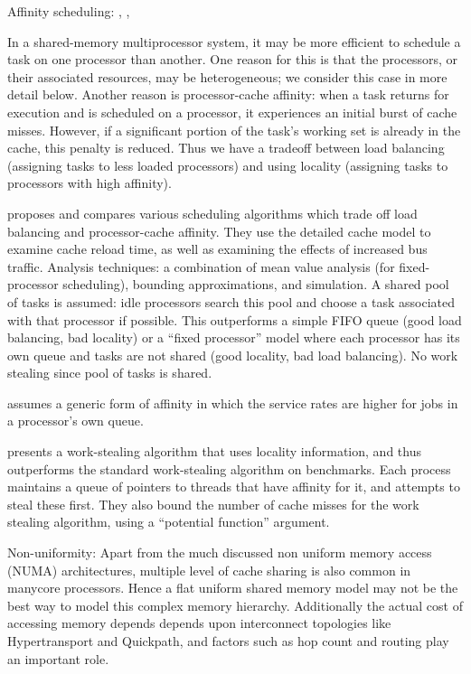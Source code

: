 
Affinity scheduling: \cite{Squillante1993}, \cite{Squillante2001},
\cite{Acar2002}

In a shared-memory multiprocessor system, it may be more efficient to
schedule a task on one processor than another. One reason for this is
that the processors, or their associated resources, may be
heterogeneous; we consider this case in more detail below. Another
reason is processor-cache affinity: when a task returns for execution
and is scheduled on a processor, it experiences an initial burst of
cache misses. However, if a significant portion of the task's working
set is already in the cache, this penalty is reduced. Thus we have a
tradeoff between load balancing (assigning tasks to less loaded
processors) and using locality (assigning tasks to processors with
high affinity).

\cite{Squillante1993} proposes and compares various scheduling
algorithms which trade off load balancing and processor-cache
affinity. They use the detailed cache model to examine cache reload
time, as well as examining the effects of increased bus
traffic. Analysis techniques: a combination of mean value analysis
(for fixed-processor scheduling), bounding approximations, and
simulation. A shared pool of tasks is assumed: idle processors search
this pool and choose a task associated with that processor if
possible. This outperforms a simple FIFO queue (good load balancing,
bad locality) or a ``fixed processor'' model where each processor has
its own queue and tasks are not shared (good locality, bad load
balancing). No work stealing since pool of tasks is shared.

\cite{Squillante2001} assumes a generic form of affinity in which the
service rates are higher for jobs in a processor's own queue.

\cite{Acar2002} presents a work-stealing algorithm that uses locality
information, and thus outperforms the standard work-stealing algorithm
on benchmarks. Each process maintains a queue of pointers to threads
that have affinity for it, and attempts to steal these first. They
also bound the number of cache misses for the work stealing algorithm,
using a ``potential function'' argument.


Non-uniformity: Apart from the much discussed non uniform memory
access (NUMA) architectures, multiple level of cache sharing is also
common in manycore processors. Hence a flat uniform shared memory
model may not be the best way to model this complex memory hierarchy.
Additionally the actual cost of accessing memory depends depends upon
interconnect topologies like Hypertransport and Quickpath, and factors
such as hop count and routing play an important role.

